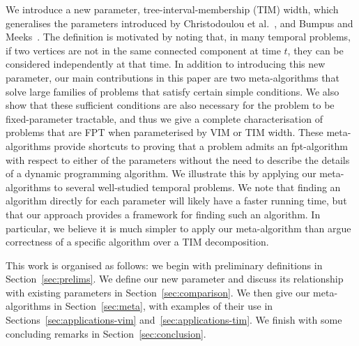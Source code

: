 \documentclass[a4paper,UKenglish,cleveref, autoref, thm-restate]{lipics-v2021} %
\begin{document}
We introduce a new parameter, tree-interval-membership (TIM) width, which generalises the parameters introduced by Christodoulou et al.~\cite{christodoulou_making_2024}, and Bumpus and Meeks~\cite{bumpus_edge_2023}. The definition is motivated by noting that, in many temporal problems, if two vertices are not in the same connected component at time $t$, they can be considered independently at that time. 
In addition to introducing this new parameter, our main contributions in this paper are two meta-algorithms
that solve large families of problems that satisfy certain simple conditions. We also show that these sufficient conditions are also necessary for the problem to be fixed-parameter tractable, and thus we give a complete characterisation of problems that are FPT when parameterised by VIM or TIM width.
These meta-algorithms provide shortcuts to proving that a problem admits an fpt-algorithm with respect to either of the parameters without the need to describe the details of a dynamic programming algorithm. We illustrate this by applying our meta-algorithms to several well-studied temporal problems. We note that finding an algorithm directly for each parameter will likely have a faster running time, but that our approach provides a framework for finding such an algorithm. In particular, we believe it is much simpler to apply our meta-algorithm than argue correctness of a specific algorithm over a TIM decomposition.


This work is organised as follows: we begin with preliminary definitions in Section~\ref{sec:prelims}. We define our new parameter and discuss its relationship with existing parameters in Section~\ref{sec:comparison}. We then give our meta-algorithms in Section~\ref{sec:meta}, with examples of their use in Sections~\ref{sec:applications-vim} and~\ref{sec:applications-tim}. We finish with some concluding remarks in Section~\ref{sec:conclusion}. 
\end{document}
